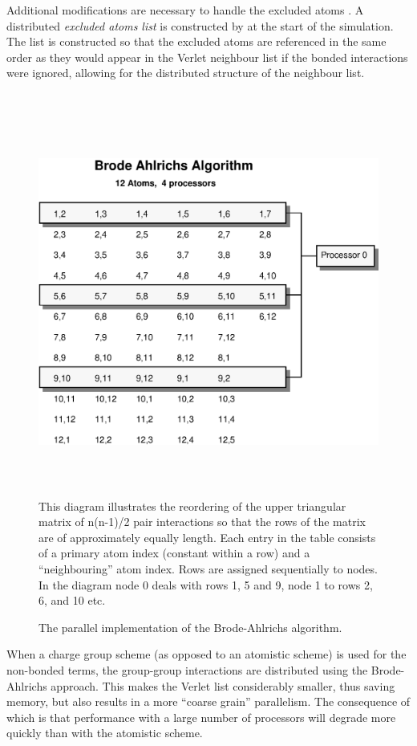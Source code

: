 Additional modifications are necessary to handle the excluded atoms
\cite{smith-93a}. A distributed {\em excluded atoms
list} is constructed by \D{} at the start of the simulation. The list is
constructed so that the excluded atoms are referenced in the same
order as they would appear in the Verlet neighbour list if the bonded
interactions were ignored, allowing for the distributed structure of
the neighbour list.

~

\vskip 5mm
\begin{figure}[ht]
\begin{center}
\includegraphics[height=12cm]{brode.eps}
\caption{The parallel implementation of the Brode-Ahlrichs algorithm.\label{BAscheme}}
\end{center}
This diagram illustrates the reordering of the upper triangular matrix
of n(n-1)/2 pair interactions so that the rows of the matrix are of
approximately equally length.  Each entry in the table consists of a
primary atom index (constant within a row) and a ``neighbouring'' atom
index.  Rows are assigned sequentially to nodes. In the diagram node 0
deals with rows 1, 5 and 9, node 1 to rows 2, 6, and 10 etc.
\end{figure}
\vskip 5mm

When a charge group scheme (as opposed to an atomistic scheme) is used
for the non-bonded terms, the group-group interactions are distributed
using the Brode-Ahlrichs approach. This makes the Verlet list
considerably smaller, thus saving memory, but also results in a more
``coarse grain'' parallelism. The consequence of which is that
performance with a large number of processors will degrade more
quickly than with the atomistic scheme.

